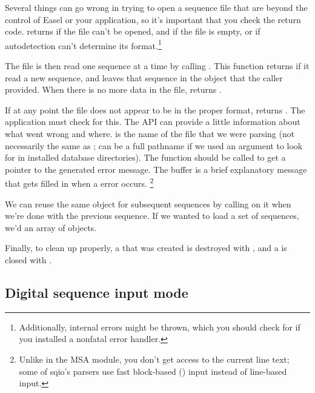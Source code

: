 Several things can go wrong in trying to open a sequence file that are
beyond the control of Easel or your application, so it's important
that you check the return code.   returns
 if the file can't be opened, and
 if the file is empty, or if autodetection can't
determine its format.\footnote{Additionally, internal errors might be
  thrown, which you should check for if you installed a nonfatal error
  handler.}

The file is then read one sequence at a time by calling
. This function returns 
if it read a new sequence, and leaves that sequence in the 
object that the caller provided.  When there is no more data in the
file,  returns . 

If at any point the file does not appear to be in the proper format,
 returns . The application
must check for this. The API can provide a little information about
what went wrong and where.  is the name of the
file that we were parsing (not necessarily the same as
;  can be a full pathname if we
used an  argument to look for  in installed
database directories). The function 
should be called to get a pointer to the generated error message.  The
buffer is a brief explanatory message that gets filled in when a
 error occurs.
  \footnote{Unlike in the MSA module, you don't get access to the
  current line text; some of sqio's parsers use fast block-based
  () input instead of line-based input.}

We can reuse the same  object for subsequent sequences
by calling  on it when we're done with the
previous sequence. If we wanted to load a set of sequences, we'd
 an array of  objects. 

Finally, to clean up properly, a  that was created is
destroyed with , and a 
is closed with .


\subsection{Digital sequence input mode}

